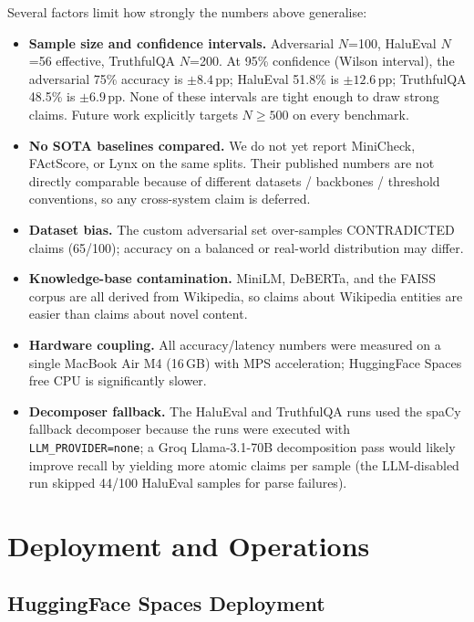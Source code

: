 \documentclass[12pt, a4paper, oneside]{report}
\begin{document}
Several factors limit how strongly the numbers above generalise:
\begin{itemize}[nosep]
    \item \textbf{Sample size and confidence intervals.} Adversarial $N$=100, HaluEval $N$=56 effective, TruthfulQA $N$=200. At 95\% confidence (Wilson interval), the adversarial 75\% accuracy is $\pm 8.4$\,pp; HaluEval 51.8\% is $\pm 12.6$\,pp; TruthfulQA 48.5\% is $\pm 6.9$\,pp. None of these intervals are tight enough to draw strong claims. Future work explicitly targets $N \geq 500$ on every benchmark.
    \item \textbf{No SOTA baselines compared.} We do not yet report MiniCheck, FActScore, or Lynx on the same splits. Their published numbers are not directly comparable because of different datasets / backbones / threshold conventions, so any cross-system claim is deferred.
    \item \textbf{Dataset bias.} The custom adversarial set over-samples CONTRADICTED claims (65/100); accuracy on a balanced or real-world distribution may differ.
    \item \textbf{Knowledge-base contamination.} MiniLM, DeBERTa, and the FAISS corpus are all derived from Wikipedia, so claims about Wikipedia entities are easier than claims about novel content.
    \item \textbf{Hardware coupling.} All accuracy/latency numbers were measured on a single MacBook Air M4 (16\,GB) with MPS acceleration; HuggingFace Spaces free CPU is significantly slower.
    \item \textbf{Decomposer fallback.} The HaluEval and TruthfulQA runs used the spaCy fallback decomposer because the runs were executed with \texttt{LLM\_PROVIDER=none}; a Groq Llama-3.1-70B decomposition pass would likely improve recall by yielding more atomic claims per sample (the LLM-disabled run skipped 44/100 HaluEval samples for parse failures).
\end{itemize}

\chapter{Deployment and Operations}

\label{ch:deployment}

\section{HuggingFace Spaces Deployment}
\end{document}
